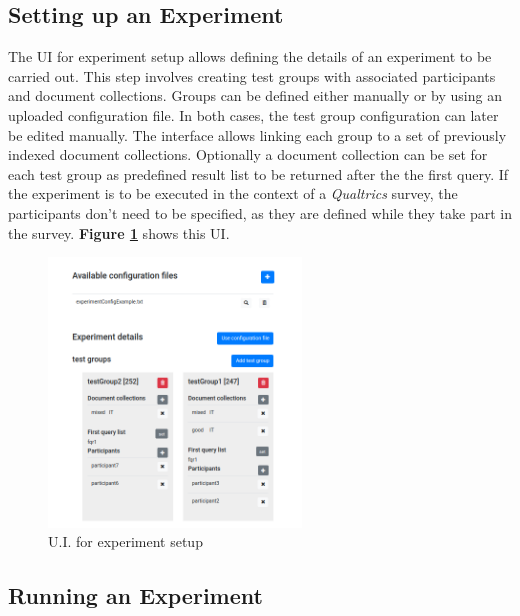 \documentclass[a4paper]{usiinfbachelorproject}
\begin{document}
\subsection{\textbf{Setting up an Experiment}} \label{sec:designExpSetup}

The UI for experiment setup allows defining the details of an experiment to be carried out. This step involves creating
test groups with associated participants and document collections. Groups can be defined either manually or by using 
an uploaded configuration file. In both cases, the test group configuration can later be edited manually. 
The interface allows linking each group to a set of previously indexed document collections. Optionally a document collection
can be set for each test group as predefined result list to be returned after the the first query.
If the experiment is to be executed in the context of a \emph{Qualtrics} survey, the participants don't need to be specified, as they are
defined while they take part in the survey. 
\textbf{Figure \ref{fig:setup}} shows this UI.

\begin{figure}[h!]
\centering
\includegraphics[width=0.6\textwidth]{figures/setup}
\caption{U.I. for experiment setup}
\label{fig:setup}
\end{figure}


\subsection{\textbf{Running an Experiment}} \label{sec:designExpRun}
\end{document}
